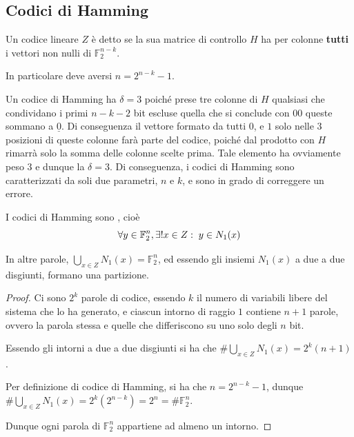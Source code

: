 \subsection{Codici di Hamming}

\begin{definition}{}
  Un codice lineare \(Z\)  è detto  se la sua matrice di controllo \(H\) ha per colonne \textbf{tutti} i vettori non nulli di \(\mathbb{F}_2^{n-k}\).

  In particolare deve aversi \(n = 2^{n-k} - 1\).
\end{definition}


Un codice di Hamming ha \(\delta = 3\) poiché prese tre colonne di \(H\) qualsiasi che condividano i primi \(n-k-2\) bit escluse quella che si conclude con \(00\) queste sommano a \(\underline{0}\).
Di conseguenza il vettore formato da tutti \(0\), e \(1\) solo nelle \(3\) posizioni di queste colonne farà parte del codice, poiché dal prodotto con \(H\) rimarrà solo la somma delle colonne scelte prima.
Tale elemento ha ovviamente peso \(3\) e dunque la \(\delta = 3\).
Di conseguenza, i codici di Hamming sono caratterizzati da soli due parametri, \(n\) e \(k\), e sono in grado di correggere un errore.

\begin{theorem}{}
  I codici di Hamming sono , cioè
  \[\forall y \in \mathbb{F}_2^n,\exists!x\in Z:\; y \in N_1(x)\]

  In altre parole, \(\bigcup_{x \in Z} N_1(x) = \mathbb{F}_2^n\), ed essendo gli insiemi \(N_1(x)\) a due a due disgiunti, formano una partizione.
\end{theorem}

\begin{proof}
  Ci sono \(2^k\) parole di codice, essendo \(k\) il numero di variabili libere del sistema che lo ha generato, e ciascun intorno di raggio \(1\) contiene \(n+1\) parole, ovvero la parola stessa e quelle che differiscono su uno solo degli \(n\) bit.
  
  Essendo gli intorni a due a due disgiunti si ha che \(\#\bigcup_{x \in Z}N_1(x) = 2^k(n+1) \).
  
  Per definizione di codice di Hamming, si ha che \(n = 2^{n-k}-1\), dunque \(\#\bigcup_{x \in Z}N_1(x) = 2^k(2^{n-k}) = 2^n = \#\mathbb{F}_2^n\).

  Dunque ogni parola di \(\mathbb{F}_2^n\) appartiene ad almeno un intorno.
\end{proof}

